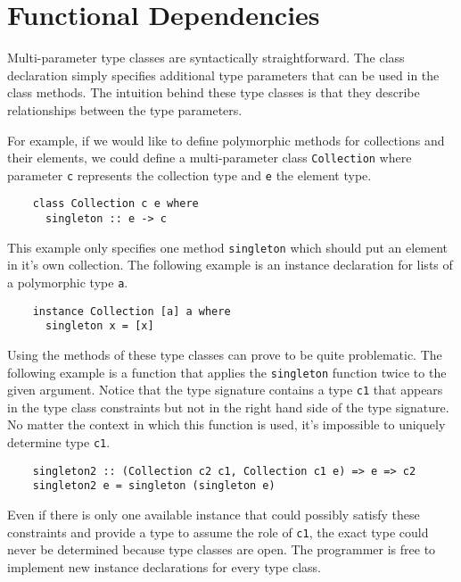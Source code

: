 \section{Functional Dependencies}
Multi-parameter type classes are syntactically straightforward. The class
declaration simply specifies additional type parameters that can be used
in the class methods. The intuition behind these type classes is that they
describe relationships between the type parameters.

For example, if we would like to define polymorphic methods for collections and their
elements, we could define a multi-parameter class \texttt{Collection} where
parameter \texttt{c} represents the collection type and \texttt{e} the
element type.
\begin{verbatim}
    class Collection c e where
      singleton :: e -> c
\end{verbatim}
This example only specifies one method \texttt{singleton} which
should put an element in it's own collection.
The following example is an instance declaration for lists of a polymorphic type
\texttt{a}.
\begin{verbatim}
    instance Collection [a] a where
      singleton x = [x]
\end{verbatim}

Using the methods of these type classes can prove to be quite problematic. The
following example is a function that applies the \texttt{singleton} function
twice to the given argument. Notice that the type signature contains a type
\texttt{c1} that appears in the type class constraints but not in the right hand
side of the type signature. No matter the context in which this function is
used, it's impossible to uniquely determine type \texttt{c1}.

\begin{verbatim}
    singleton2 :: (Collection c2 c1, Collection c1 e) => e => c2
    singleton2 e = singleton (singleton e)
\end{verbatim}

Even if there is only one available instance that could possibly satisfy these
constraints and provide a type to assume the role of \texttt{c1}, the exact
type could never be determined because type classes are open. The programmer
is free to implement new instance declarations for every type class.


